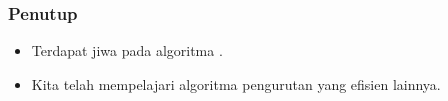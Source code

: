 \begin{frame}
\frametitle{Penutup}
\begin{itemize}
  \item Terdapat jiwa \fdivideAndConquer pada algoritma \fquickSort.
  \item Kita telah mempelajari algoritma pengurutan yang efisien lainnya.
\end{itemize}
\end{frame}


